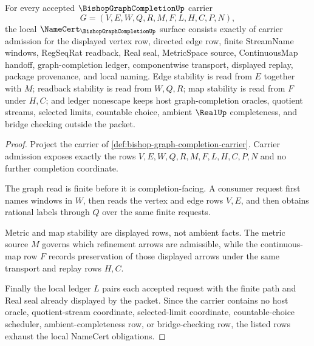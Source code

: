 \begin{theorem}
\label{thm:bishop-graph-completion-namecert-obligations}
For every accepted $\BishopGraphCompletionUp$ carrier
$$
G=(V,E,W,Q,R,M,F,L,H,C,P,N),
$$
the local $\NameCert_{\BishopGraphCompletionUp}$ surface consists exactly of carrier admission for the displayed vertex row, directed edge row, finite StreamName windows, RegSeqRat readback, Real seal, MetricSpace source, ContinuousMap handoff, graph-completion ledger, componentwise transport, displayed replay, package provenance, and local naming. Edge stability is read from $E$ together with $M$; readback stability is read from $W,Q,R$; map stability is read from $F$ under $H,C$; and ledger nonescape keeps host graph-completion oracles, quotient streams, selected limits, countable choice, ambient $\RealUp$ completeness, and bridge checking outside the packet.
\end{theorem}
\begin{proof}
Project the carrier of \autoref{def:bishop-graph-completion-carrier}. Carrier admission exposes exactly the rows $V,E,W,Q,R,M,F,L,H,C,P,N$ and no further completion coordinate.

The graph read is finite before it is completion-facing. A consumer request first names windows in $W$, then reads the vertex and edge rows $V,E$, and then obtains rational labels through $Q$ over the same finite requests.

Metric and map stability are displayed rows, not ambient facts. The metric source $M$ governs which refinement arrows are admissible, while the continuous-map row $F$ records preservation of those displayed arrows under the same transport and replay rows $H,C$.

Finally the local ledger $L$ pairs each accepted request with the finite path and Real seal already displayed by the packet. Since the carrier contains no host oracle, quotient-stream coordinate, selected-limit coordinate, countable-choice scheduler, ambient-completeness row, or bridge-checking row, the listed rows exhaust the local NameCert obligations.
\end{proof}

